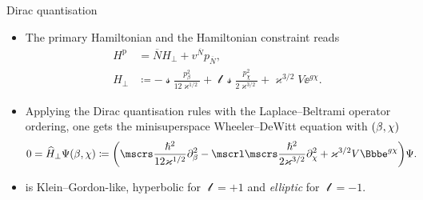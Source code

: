 \documentclass[8pt]{beamer}
\begin{document}
\begin{frame}%
{Dirac quantisation}%
\begin{itemize}
\item
The primary Hamiltonian and the Hamiltonian
constraint reads
\begin{align}
H^\text{p} &= \overline{N}H_\perp + v^{\overline{N}} p_{\overline{N}},
\\
H_\perp &\coloneqq -\mscrs\frac{p_\beta^2}{12\varkappa^{1/2}}
+\mscrl\mscrs\frac{p_\chi^2}{2\varkappa^{3/2}}
+\varkappa^{3/2}V\ee^{g\chi}.
\end{align}
\item
Applying the Dirac quantisation rules with the Laplace--Beltrami
operator ordering, one 
gets the minisuperspace Wheeler--DeWitt equation with ${\left(\beta,\chi\right)}$
\begin{align}
0 &= \widehat{H}_\perp \rfun{\Psi}{\beta,\chi} \coloneqq
\rbr{\mscrs\frac{\hslash^2}{12\varkappa^{1/2}}\partial_{\beta}^2
-\mscrl\mscrs\frac{\hslash^2}{2\varkappa^{3/2}}\partial_{\chi}^2
+\varkappa^{3/2}V\ee^{g \chi}}\Psi.
\label{eq:WDW-10}
\end{align}
\item
{} is Klein--Gordon-like, hyperbolic for $\mscrl = +1$ and 
\emph{elliptic} for $\mscrl = -1$.
\end{itemize}
\end{frame}
\end{document}
